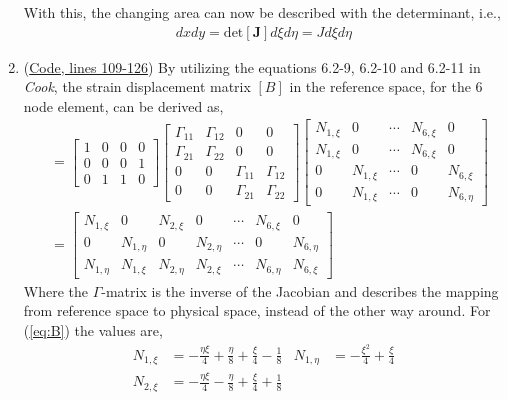 \documentclass{article}
\begin{document}
\begin{enumerate}
With this, the changing area can now be described with the determinant, i.e., 
\begin{align}
	dxdy = \text{det}[\mathbf{J}]d\xi d\eta = Jd\xi d\eta
	\label{eq:jac3}
\end{align}
\item (\hyperref[code1]{Code, lines 109-126}) By utilizing the equations 6.2-9, 6.2-10 and 6.2-11 in \textit{Cook}, the strain displacement matrix $[B]$ in the reference space, for the 6 node element, can be derived as, 
 \begin{align}
[B] &= 
\begin{bmatrix}
	 1 & 0 & 0 & 0 \\
	 0 & 0 & 0 & 1 \\
	 0 & 1 & 1 & 0
\end{bmatrix}
\begin{bmatrix}
	 \Gamma_{11} & \Gamma_{12} & 0 & 0 \\
	 \Gamma_{21} & \Gamma_{22} & 0 & 0 \\
	 0 & 0 & \Gamma_{11} & \Gamma_{12} \\
	 0 & 0 & \Gamma_{21} & \Gamma_{22}
\end{bmatrix}
\begin{bmatrix}
	 N_{1,\xi} & 0 & \cdots & N_{6,\xi} & 0 \\
	 N_{1,\xi} & 0 & \cdots & N_{6,\xi} & 0 \\
	 0 & N_{1,\xi} & \cdots & 0 & N_{6,\xi} \\
	 0 & N_{1,\xi} & \cdots & 0 & N_{6,\eta} 
\end{bmatrix} \\
    &= 
\begin{bmatrix}
	N_{1,\xi} & 0 & N_{2,\xi} & 0 & \cdots & N_{6,\xi} & 0 \\
	0 & N_{1,\eta} & 0 & N_{2,\eta} & \cdots & 0 & N_{6,\eta} \\
	N_{1,\eta} & N_{1,\xi}  & N_{2,\eta} & N_{2,\xi}  & \cdots &  N_{6,\eta} & N_{6,\xi} \label{eq:B}
\end{bmatrix}
\end{align}
Where the $\Gamma$-matrix is the inverse of the Jacobian and describes the mapping from reference space to physical space, instead of the other way around. For (\ref{eq:B}) the values are,
\begin{align*}
	N_{1,\xi} &= - \frac{\eta \xi}{4} + \frac{\eta}{8} + \frac{\xi}{4} - \frac{1}{8} &
	N_{1,\eta} &= - \frac{\xi^{2}}{4} + \frac{\xi}{4} \\
	N_{2,\xi} &= - \frac{\eta \xi}{4} - \frac{\eta}{8} + \frac{\xi}{4} + \frac{1}{8} & 

\end{align*}
\end{enumerate}
\end{document}
